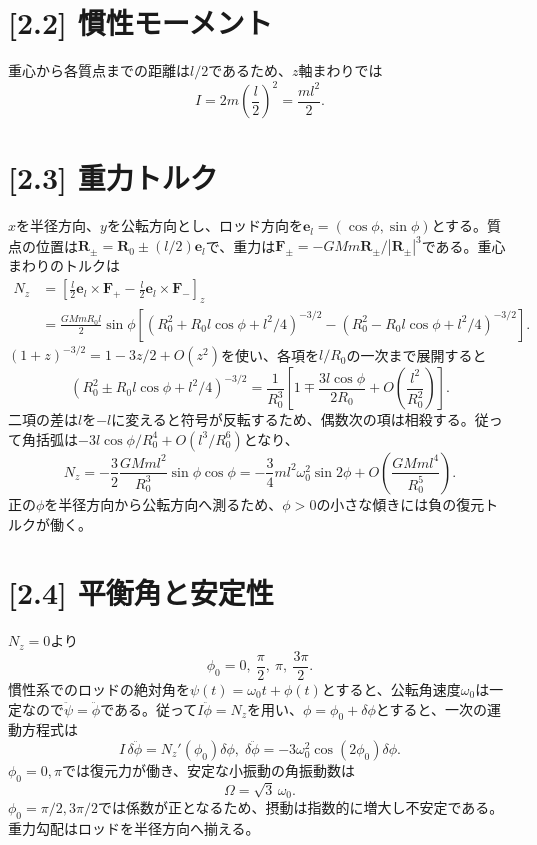 \documentclass[11pt,a4paper]{article}
\begin{document}
\section*{[2.2] 慣性モーメント}
重心から各質点までの距離は$l/2$であるため、$z$軸まわりでは
\begin{equation}
 \boxed{I=2m\left(\frac l2\right)^2=\frac{ml^2}{2}}.
\end{equation}

\section*{[2.3] 重力トルク}
$x$を半径方向、$y$を公転方向とし、ロッド方向を$\boldsymbol e_l=(\cos\phi,\sin\phi)$とする。質点の位置は$\boldsymbol R_\pm=\boldsymbol R_0\pm(l/2)\boldsymbol e_l$で、重力は$\boldsymbol F_\pm=-GMm\boldsymbol R_\pm/|\boldsymbol R_\pm|^3$である。重心まわりのトルクは
\begin{align}
 N_z&=\left[\frac l2\boldsymbol e_l\times\boldsymbol F_+ -\frac l2\boldsymbol e_l\times\boldsymbol F_-\right]_z\\
 &=\frac{GMmR_0l}{2}\sin\phi\left[
 (R_0^2+R_0l\cos\phi+l^2/4)^{-3/2}
 -(R_0^2-R_0l\cos\phi+l^2/4)^{-3/2}\right].
\end{align}
$(1+z)^{-3/2}=1-3z/2+O(z^2)$を使い、各項を$l/R_0$の一次まで展開すると
\begin{equation}
 (R_0^2\pm R_0l\cos\phi+l^2/4)^{-3/2}
 =\frac1{R_0^3}\left[1\mp\frac{3l\cos\phi}{2R_0}
 +O\!\left(\frac{l^2}{R_0^2}\right)\right].
\end{equation}
二項の差は$l$を$-l$に変えると符号が反転するため、偶数次の項は相殺する。従って角括弧は$-3l\cos\phi/R_0^4+O(l^3/R_0^6)$となり、
\begin{equation}
 \boxed{N_z=-\frac32\frac{GMm l^2}{R_0^3}\sin\phi\cos\phi
 =-\frac34ml^2\omega_0^2\sin2\phi+O\!\left(\frac{GMm l^4}{R_0^5}\right)}.
\end{equation}
正の$\phi$を半径方向から公転方向へ測るため、$\phi>0$の小さな傾きには負の復元トルクが働く。

\section*{[2.4] 平衡角と安定性}
$N_z=0$より
\begin{equation}
 \boxed{\phi_0=0,\ \frac\pi2,\ \pi,\ \frac{3\pi}{2}}.
\end{equation}
慣性系でのロッドの絶対角を$\psi(t)=\omega_0t+\phi(t)$とすると、公転角速度$\omega_0$は一定なので$\ddot\psi=\ddot\phi$である。従って$I\ddot\phi=N_z$を用い、$\phi=\phi_0+\delta\phi$とすると、一次の運動方程式は
\begin{equation}
 I\,\delta\ddot\phi=N_z'(\phi_0)\delta\phi,\;
 \delta\ddot\phi=-3\omega_0^2\cos(2\phi_0)\delta\phi.
\end{equation}
$\phi_0=0,\pi$では復元力が働き、安定な小振動の角振動数は
\begin{equation}
 \boxed{\Omega=\sqrt3\,\omega_0}.
\end{equation}
$\phi_0=\pi/2,3\pi/2$では係数が正となるため、摂動は指数的に増大し不安定である。重力勾配はロッドを半径方向へ揃える。
\end{document}
